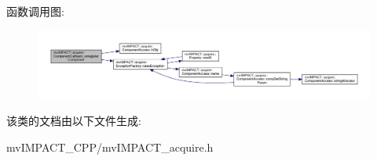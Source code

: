 函数调用图\+:
\nopagebreak
\begin{figure}[H]
\begin{center}
\leavevmode
\includegraphics[width=350pt]{classmv_i_m_p_a_c_t_1_1acquire_1_1_component_callback_a8e4afb1f424f70e9dea237fb1c5c0a3d_cgraph}
\end{center}
\end{figure}




该类的文档由以下文件生成\+:\begin{DoxyCompactItemize}
\item 
mv\+I\+M\+P\+A\+C\+T\+\_\+\+C\+P\+P/mv\+I\+M\+P\+A\+C\+T\+\_\+acquire.\+h\end{DoxyCompactItemize}
